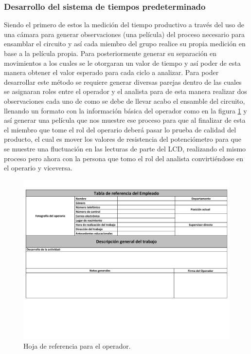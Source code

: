 \subsubsection{Desarrollo del sistema de tiempos predeterminado}

        Siendo el primero de estos la medición del tiempo productivo a través del uso de una cámara para generar observaciones (una película) del proceso necesario para ensamblar el circuito y así cada miembro del grupo realice su propia medición en base a la película propia. Para posteriormente generar su separación en movimientos a los cuales se le otorgaran un valor de tiempo y así poder de esta manera obtener el valor esperado para cada ciclo a analizar. 
        Para poder desarrollar este método se requiere generar diversas parejas dentro de las cuales se asignaran roles entre el operador y el analista para de esta manera realizar dos observaciones cada uno de como se debe de llevar acabo el ensamble del circuito, llenando un formato con la información básica del operador como en la figura \ref{fig:tabla_Referencia} y así generar una película que nos muestre ese proceso para que al finalizar de esta el miembro que tome el rol del operario deberá pasar lo prueba de calidad del producto, el cual es mover los valores de resistencia del potenciómetro para que se muestre una fluctuación en las lecturas de parte del LCD, realizando el mismo proceso pero ahora con la persona que tomo el rol del analista convirtiéndose en el operario y viceversa.
        \begin{figure}[H]
        \centering
        \includegraphics[trim = {1mm 50mm 1mm 1mm},clip,scale=0.3]{19/Img/tabla_Referencia.pdf}
        \caption{Hoja de referencia para el operador.}
        \label{fig:tabla_Referencia}
    \end{figure}
    
